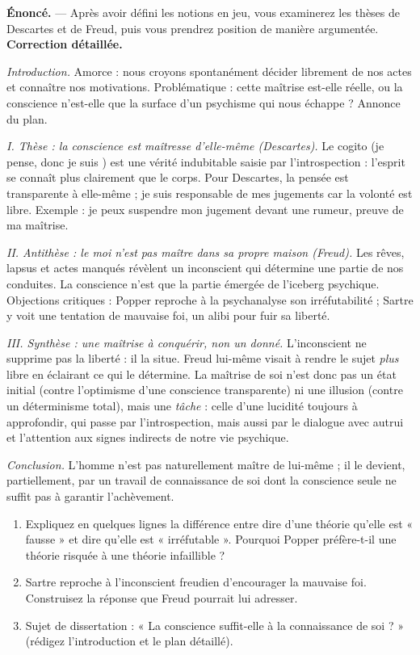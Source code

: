 \documentclass[11pt]{article}
\begin{document}
\begin{exoresolu}
\textbf{Énoncé.} — Après avoir défini les notions en jeu, vous examinerez les thèses de Descartes et de Freud, puis vous prendrez position de manière argumentée.
\tcblower
\textbf{Correction détaillée.}

\emph{Introduction.} Amorce : nous croyons spontanément décider librement de nos actes et connaître nos motivations. Problématique : cette maîtrise est-elle réelle, ou la conscience n'est-elle que la surface d'un psychisme qui nous échappe ? Annonce du plan.

\emph{I. Thèse : la conscience est maîtresse d'elle-même (Descartes).} Le cogito (\guillemotleft je pense, donc je suis \guillemotright) est une vérité indubitable saisie par l'introspection : l'esprit se connaît plus clairement que le corps. Pour Descartes, la pensée est transparente à elle-même ; je suis responsable de mes jugements car la volonté est libre. Exemple : je peux suspendre mon jugement devant une rumeur, preuve de ma maîtrise.

\emph{II. Antithèse : le moi n'est pas maître dans sa propre maison (Freud).} Les rêves, lapsus et actes manqués révèlent un inconscient qui détermine une partie de nos conduites. La conscience n'est que la partie émergée de l'iceberg psychique. Objections critiques : Popper reproche à la psychanalyse son irréfutabilité ; Sartre y voit une tentation de mauvaise foi, un alibi pour fuir sa liberté.

\emph{III. Synthèse : une maîtrise à conquérir, non un donné.} L'inconscient ne supprime pas la liberté : il la situe. Freud lui-même visait à rendre le sujet \emph{plus} libre en éclairant ce qui le détermine. La maîtrise de soi n'est donc pas un état initial (contre l'optimisme d'une conscience transparente) ni une illusion (contre un déterminisme total), mais une \emph{tâche} : celle d'une lucidité toujours à approfondir, qui passe par l'introspection, mais aussi par le dialogue avec autrui et l'attention aux signes indirects de notre vie psychique.

\emph{Conclusion.} L'homme n'est pas naturellement maître de lui-même ; il le devient, partiellement, par un travail de connaissance de soi dont la conscience seule ne suffit pas à garantir l'achèvement.
\end{exoresolu}

\begin{exercice}
\begin{enumerate}
\item Expliquez en quelques lignes la différence entre dire d'une théorie qu'elle est « fausse » et dire qu'elle est « irréfutable ». Pourquoi Popper préfère-t-il une théorie risquée à une théorie infaillible ?
\item Sartre reproche à l'inconscient freudien d'encourager la mauvaise foi. Construisez la réponse que Freud pourrait lui adresser.
\item Sujet de dissertation : « La conscience suffit-elle à la connaissance de soi ? » (rédigez l'introduction et le plan détaillé).
\end{enumerate}
\end{exercice}
\end{document}
